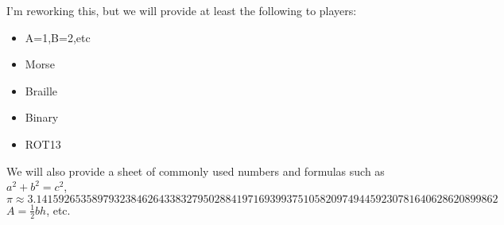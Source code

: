 \documentclass{puzzlehunt}
\begin{document}
\phTitlePage %
\phTableOfContents %



  


I'm reworking this, but we will provide at least the following to players:

\begin{itemize}
\item A=1,B=2,etc
\item Morse
\item Braille
\item Binary
\item ROT13
\end{itemize}

We will also provide a sheet of commonly used numbers and formulas
such as \(a^2+b^2=c^2\),
\[\pi\approx 3.14159265358979323846264338327950288419716939937510582097494459230781640628620899862\]
\(A=\frac{1}{2}bh\), etc.


%
%  


  


  


  


  


  


%
%  

\end{document}
